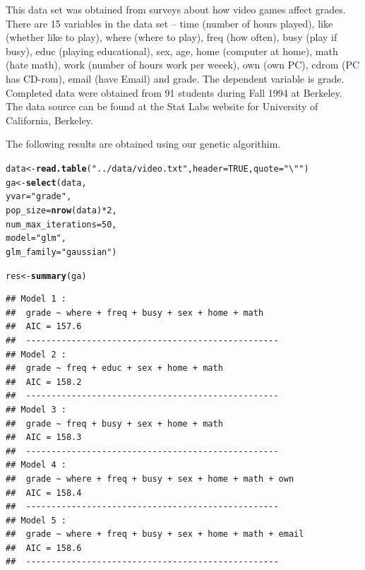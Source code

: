 \documentclass[11pt]{article}
\makeatletter
\newcommand{\hlnum}[1]{\textcolor[rgb]{0.686,0.059,0.569}{#1}}%
\newcommand{\hlstr}[1]{\textcolor[rgb]{0.192,0.494,0.8}{#1}}%
\newcommand{\hlopt}[1]{\textcolor[rgb]{0,0,0}{#1}}%
\newcommand{\hlstd}[1]{\textcolor[rgb]{0.345,0.345,0.345}{#1}}%
\newcommand{\hlkwb}[1]{\textcolor[rgb]{0.69,0.353,0.396}{#1}}%
\newcommand{\hlkwc}[1]{\textcolor[rgb]{0.333,0.667,0.333}{#1}}%
\newcommand{\hlkwd}[1]{\textcolor[rgb]{0.737,0.353,0.396}{\textbf{#1}}}%
\newenvironment{kframe}{%
 \def\at@end@of@kframe{}%
 \ifinner\ifhmode%
  \def\at@end@of@kframe{\end{minipage}}%
  \begin{minipage}{\columnwidth}%
 \fi\fi%
 \def\FrameCommand##1{\hskip\@totalleftmargin \hskip-\fboxsep
 \colorbox{shadecolor}{##1}\hskip-\fboxsep
     \hskip-\linewidth \hskip-\@totalleftmargin \hskip\columnwidth}%
 \MakeFramed {\advance\hsize-\width
   \@totalleftmargin\z@ \linewidth\hsize
   \@setminipage}}%
 {\par\unskip\endMakeFramed%
 \at@end@of@kframe}
\newenvironment{knitrout}{}{} %
\makeatother
\begin{document}
This data set was obtained from surveys about how video games 
affect grades. There are 15 variables in the data set -- time (number of 
hours played), like (whether like to play), where (where to play), freq (how 
often), busy (play if busy), educ (playing educational), sex, age, home 
(computer at home), math (hate math), work (number of hours work per weeek), 
own (own PC), cdrom (PC has CD-rom), email (have Email) and grade. The 
dependent variable is grade. Completed data were obtained from 91 students 
during Fall 1994 at Berkeley. The data source can be found at the Stat Labs 
website for University of California, Berkeley. 

The following results are obtained using our genetic algorithim.

\begin{knitrout}
\color{fgcolor}\begin{kframe}
\begin{alltt}
\hlstd{data} \hlkwb{<-} \hlkwd{read.table}\hlstd{(}\hlstr{"../data/video.txt"}\hlstd{,} \hlkwc{header} \hlstd{=} \hlnum{TRUE}\hlstd{,} \hlkwc{quote} \hlstd{=} \hlstr{"\textbackslash{}""}\hlstd{)}
\hlstd{ga} \hlkwb{<-} \hlkwd{select}\hlstd{(data,}
                   \hlkwc{yvar} \hlstd{=} \hlstr{"grade"}\hlstd{,}
                   \hlkwc{pop_size} \hlstd{=} \hlkwd{nrow}\hlstd{(data)}\hlopt{*}\hlnum{2}\hlstd{,}
                   \hlkwc{num_max_iterations} \hlstd{=} \hlnum{50}\hlstd{,}
                   \hlkwc{model} \hlstd{=} \hlstr{"glm"}\hlstd{,}
                   \hlkwc{glm_family} \hlstd{=} \hlstr{"gaussian"}\hlstd{)}
\end{alltt}
\end{kframe}
\end{knitrout}

\begin{knitrout}
\color{fgcolor}\begin{kframe}
\begin{alltt}
\hlstd{res} \hlkwb{<-} \hlkwd{summary}\hlstd{(ga)}
\end{alltt}
\begin{verbatim}
## Model 1 :
##  grade ~ where + freq + busy + sex + home + math 
##  AIC = 157.6 
##  --------------------------------------------------
## Model 2 :
##  grade ~ freq + educ + sex + home + math 
##  AIC = 158.2 
##  --------------------------------------------------
## Model 3 :
##  grade ~ freq + busy + sex + home + math 
##  AIC = 158.3 
##  --------------------------------------------------
## Model 4 :
##  grade ~ where + freq + busy + sex + home + math + own 
##  AIC = 158.4 
##  --------------------------------------------------
## Model 5 :
##  grade ~ where + freq + busy + sex + home + math + email 
##  AIC = 158.6 
##  --------------------------------------------------
\end{verbatim}
\end{kframe}
\end{knitrout}
\end{document}
